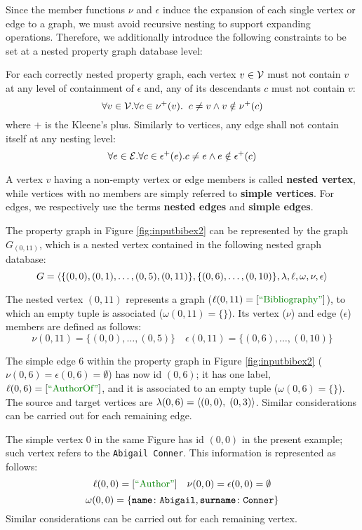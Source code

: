 Since the member functions $\nu$ and $\epsilon$ induce the expansion of each single vertex or edge to a graph, we must avoid recursive nesting to support expanding operations.
Therefore, we additionally introduce the following constraints to be set at a nested property graph database level:

\begin{axiom}
	For each correctly nested property graph, each vertex $v\in \mathcal{V}$ must not contain $v$ at any level of containment of $\epsilon$ and, any of its descendants $c$ must not contain $v$:
	\[\forall v\in \mathcal{V}. \forall c\in \nu^+(v).\;\; c\neq v\wedge v\notin \nu^+(c)\]
	where $+$ is the Kleene's plus. Similarly to vertices, any edge shall not contain itself at any nesting level:
	\[\forall e\in \mathcal{E}. \forall c\in \epsilon^+(e). c\neq e\wedge e\notin \epsilon^+(c)\]
\end{axiom}

A vertex $v$ having a non-empty vertex or edge members is called \textbf{nested vertex}, while vertices with no members are simply referred to \textbf{simple vertices}. For edges, we respectively use the terms \textbf{nested edges} and \textbf{simple edges}. 

\begin{ex}[label=exImpl]
The property graph in Figure \ref{fig:inputbibex2} can be represented by the graph $G_{(0,11)}$, which is a nested vertex contained in the following nested graph database:
\[G=\Braket{\{(0,0),(0,1),\dots,(0,5),(0,11)\}, \{(0,6),\dots,(0,10)\},\lambda,\ell,\omega,\nu,\epsilon}\]

The nested vertex $(0,11)$  represents a  graph ($\ell(0,11)=[\mstr{Bibliography}]$), to which an empty tuple is associated ($\omega(0,11)=\{\}$). Its vertex ($\nu$) and edge ($\epsilon$) members are defined as follows:
\[\nu(0,11)=\{(0,0),\dots,(0,5)\}\quad\epsilon(0,11)=\{(0,6),\dots,(0,10)\}\]

The simple edge $6$ within the property graph in Figure \ref{fig:inputbibex2} ($\nu(0,6)=\epsilon(0,6)=\emptyset$) has now id $(0,6)$; it has one label, $\ell(0,6)=[\mstr{AuthorOf}]$, and it is associated to an empty tuple ($\omega(0,6)=\{\}$).
The source and target vertices are 
$\lambda(0,6)=\Braket{(0,0),\;(0,3)}$. Similar considerations can be carried out for each  remaining edge.

The simple vertex $0$ in the same Figure has id $(0,0)$ in the present example; such vertex refers to the  \texttt{Abigail Conner}. This information is represented as follows:
\[\ell(0,0)=[\mstr{Author}]\quad\nu(0,0)=\epsilon(0,0)=\emptyset\] \[\omega(0,0)=\{\texttt{\textbf{name}}\colon\texttt{Abigail},\texttt{\textbf{surname}}\colon\texttt{Conner}\}\]
Similar considerations can be carried out for each remaining vertex.

\end{ex}
